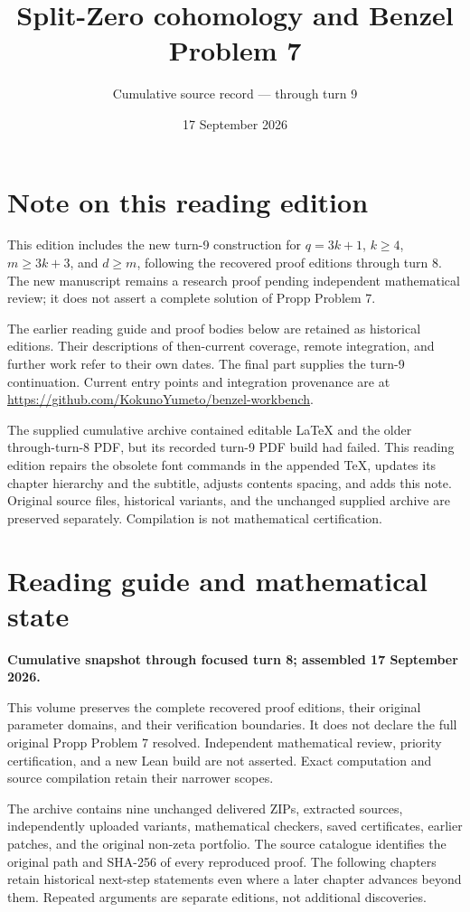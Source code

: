 \documentclass[
  10pt,
]{scrreprt}
\title{Split-Zero cohomology and Benzel Problem 7}
\subtitle{Cumulative source record --- through turn 9}
\author{}
\date{17 September 2026}
\begin{document}
\maketitle

\chapter*{Note on this reading edition}
This edition includes the new turn-9 construction for
\(q=3k+1\), \(k\ge4\), \(m\ge3k+3\), and \(d\ge m\),
following the recovered proof editions through turn 8. The new manuscript
remains a research proof pending independent mathematical review; it does
not assert a complete solution of Propp Problem 7.

The earlier reading guide and proof bodies below are retained as historical
editions. Their descriptions of then-current coverage, remote integration,
and further work refer to their own dates. The final part supplies the
turn-9 continuation. Current entry points and integration provenance are
at \url{https://github.com/KokunoYumeto/benzel-workbench}.

The supplied cumulative archive contained editable LaTeX and the older
through-turn-8 PDF, but its recorded turn-9 PDF build had failed. This
reading edition repairs the obsolete font commands in the appended
TeX, updates its chapter hierarchy and the subtitle, adjusts contents
spacing, and adds this note. Original source files,
historical variants, and the unchanged supplied archive are preserved
separately. Compilation is not mathematical certification.
\clearpage

{
\setcounter{tocdepth}{0}
\tableofcontents
}
\chapter{Reading guide and mathematical
state}\label{reading-guide-and-mathematical-state}

\textbf{Cumulative snapshot through focused turn 8; assembled 17
September 2026.}

This volume preserves the complete recovered proof editions, their
original parameter domains, and their verification boundaries. It does
not declare the full original Propp Problem 7 resolved. Independent
mathematical review, priority certification, and a new Lean build are
not asserted. Exact computation and source compilation retain their
narrower scopes.

The archive contains nine unchanged delivered ZIPs, extracted sources,
independently uploaded variants, mathematical checkers, saved
certificates, earlier patches, and the original non-zeta portfolio. The
source catalogue identifies the original path and SHA-256 of every
reproduced proof. The following chapters retain historical next-step
statements even where a later chapter advances beyond them. Repeated
arguments are separate editions, not additional discoveries.
\end{document}
